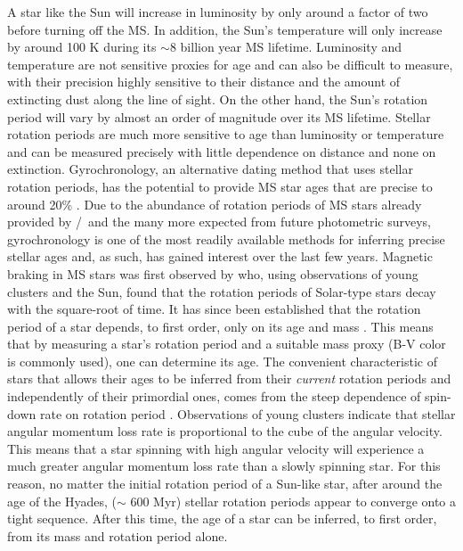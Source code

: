 A star like the Sun will increase in luminosity by only around a factor of two
before turning off the MS.
In addition, the Sun's temperature will only increase by around 100 K during
its $\sim$8 billion year MS lifetime.
Luminosity and temperature are not sensitive proxies for age and can also be
difficult to measure, with their precision highly sensitive to their distance
and the amount of extincting dust along the line of sight.
On the other hand, the Sun's rotation period will vary by almost an order of
magnitude over its MS lifetime.
Stellar rotation periods are much more sensitive to age than luminosity or
temperature and can be measured precisely with little dependence on distance
and none on extinction.
Gyrochronology, an alternative dating method that uses stellar rotation
periods, has the potential to provide MS star ages that are precise to around
20\% \citep{epstein2014}.
Due to the abundance of rotation periods of MS stars already provided by
\kepler/\ktwo\ and the many more expected from future photometric surveys,
gyrochronology is one of the most readily available methods for inferring
precise stellar ages and, as such, has gained interest over the last few
years.
Magnetic braking in MS stars was first observed by \citet{Skumanich1972} who,
using observations of young clusters and the Sun, found that the rotation
periods of Solar-type stars decay with the square-root of time.
It has since been established that the rotation period of a star depends, to
first order, only on its age and mass \citep[\eg][]{barnes2003}.
This means that by measuring a star's rotation period and a suitable mass
proxy (B-V color is commonly used), one can determine its age.
The convenient characteristic of stars that allows their ages to be inferred
from their {\it current} rotation periods and independently of their
primordial ones, comes from the steep dependence of spin-down rate on rotation
period \citep{kawaler1989}.
Observations of young clusters indicate that stellar angular momentum loss
rate is proportional to the cube of the angular velocity.
This means that a star spinning with high angular velocity will experience a
much greater angular momentum loss rate than a slowly spinning star.
For this reason, no matter the initial rotation period of a Sun-like star,
after around the age of the Hyades, ($\sim$ 600 Myr) stellar rotation periods
appear to converge onto a tight sequence.
After this time, the age of a star can be inferred, to first order, from its
mass and rotation period alone.

